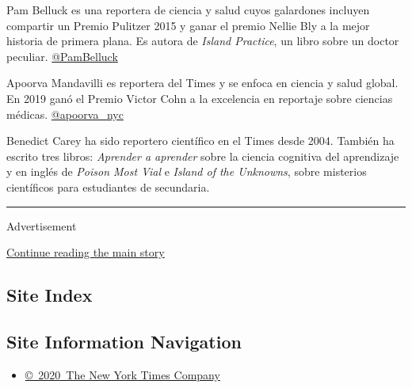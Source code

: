 Pam Belluck es una reportera de ciencia y salud cuyos galardones
incluyen compartir un Premio Pulitzer 2015 y ganar el premio Nellie Bly
a la mejor historia de primera plana. Es autora de \emph{Island
Practice}, un libro sobre un doctor peculiar.
\href{https://twitter.com/PamBelluck}{@PamBelluck}

Apoorva Mandavilli es reportera del Times y se enfoca en ciencia y salud
global. En 2019 ganó el Premio Victor Cohn a la excelencia en reportaje
sobre ciencias médicas.
\href{https://twitter.com/apoorva_nyc}{@apoorva\_nyc}

Benedict Carey ha sido reportero científico en el Times desde 2004.
También ha escrito tres libros: \emph{Aprender a aprender} sobre la
ciencia cognitiva del aprendizaje y en inglés de \emph{Poison Most Vial}
e \emph{Island of the Unknowns}, sobre misterios científicos para
estudiantes de secundaria.

\begin{center}\rule{0.5\linewidth}{\linethickness}\end{center}

Advertisement

\protect\hyperlink{after-bottom}{Continue reading the main story}

\hypertarget{site-index}{%
\subsection{Site Index}\label{site-index}}

\hypertarget{site-information-navigation}{%
\subsection{Site Information
Navigation}\label{site-information-navigation}}

\begin{itemize}
\tightlist
\item
  \href{https://help.nytimes3xbfgragh.onion/hc/en-us/articles/115014792127-Copyright-notice}{©~2020~The
  New York Times Company}
\end{itemize}

